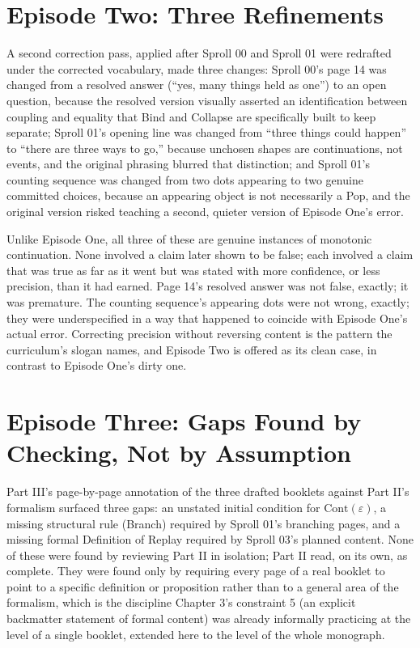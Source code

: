 \documentclass[11pt,twoside]{book}
\begin{document}
\section{Episode Two: Three Refinements}

A second correction pass, applied after Sproll 00 and Sproll 01 were redrafted under the corrected vocabulary, made three changes: Sproll 00's page 14 was changed from a resolved answer (``yes, many things held as one'') to an open question, because the resolved version visually asserted an identification between coupling and equality that Bind and Collapse are specifically built to keep separate; Sproll 01's opening line was changed from ``three things could happen'' to ``there are three ways to go,'' because unchosen shapes are continuations, not events, and the original phrasing blurred that distinction; and Sproll 01's counting sequence was changed from two dots appearing to two genuine committed choices, because an appearing object is not necessarily a Pop, and the original version risked teaching a second, quieter version of Episode One's error.

Unlike Episode One, all three of these are genuine instances of monotonic continuation. None involved a claim later shown to be false; each involved a claim that was true as far as it went but was stated with more confidence, or less precision, than it had earned. Page 14's resolved answer was not false, exactly; it was premature. The counting sequence's appearing dots were not wrong, exactly; they were underspecified in a way that happened to coincide with Episode One's actual error. Correcting precision without reversing content is the pattern the curriculum's slogan names, and Episode Two is offered as its clean case, in contrast to Episode One's dirty one.

\section{Episode Three: Gaps Found by Checking, Not by Assumption}

Part III's page-by-page annotation of the three drafted booklets against Part II's formalism surfaced three gaps: an unstated initial condition for $\mathrm{Cont}(\varepsilon)$, a missing structural rule (Branch) required by Sproll 01's branching pages, and a missing formal Definition of Replay required by Sproll 03's planned content. None of these were found by reviewing Part II in isolation; Part II read, on its own, as complete. They were found only by requiring every page of a real booklet to point to a specific definition or proposition rather than to a general area of the formalism, which is the discipline Chapter 3's constraint 5 (an explicit backmatter statement of formal content) was already informally practicing at the level of a single booklet, extended here to the level of the whole monograph.
\end{document}
